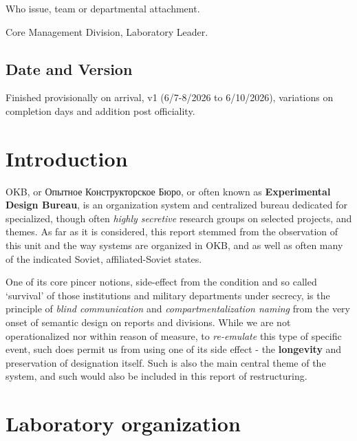 \documentclass[10pt,a4paper]{article}
\begin{document}
{\footnotesize
Who issue, team or departmental attachment. 
}

Core Management Division, Laboratory Leader. 

\subsection{Date and Version}

Finished provisionally on arrival, v1 (6/7-8/2026 to 6/10/2026), variations on completion days and addition post officiality. 

\section{Introduction}

OKB, or \foreignlanguage{russian}{Опытное Конструкторское Бюро}, or often known as \textbf{Experimental Design Bureau}, is an organization system and centralized bureau dedicated for specialized, though often \textit{highly secretive} research groups on selected projects, and themes. As far as it is considered, this report stemmed from the observation of this unit and the way systems are organized in OKB, and as well as often many of the indicated Soviet, affiliated-Soviet states. 

One of its core pincer notions, side-effect from the condition and so called `survival' of those institutions and military departments under secrecy, is the principle of \textit{blind communication} and \textit{compartmentalization naming} from the very onset of semantic design on reports and divisions. While we are not operationalized nor within reason of measure, to \textit{re-emulate} this type of specific event, such does permit us from using one of its side effect - the \textbf{longevity} and preservation of designation itself. Such is also the main central theme of the system, and such would also be included in this report of restructuring. 

\section{Laboratory organization}
\end{document}
